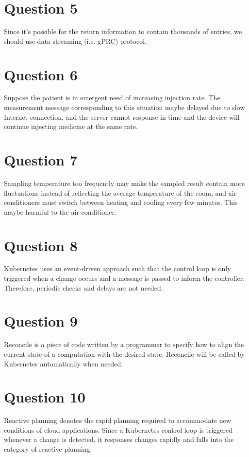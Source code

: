 \documentclass{article}
\begin{document}
\section{Question 5}
Since it's possible for the return information to contain thousands of entries, we should use data streaming (i.e. gPRC) protocol.

\section{Question 6}
Suppose the patient is in emergent need of increasing injection rate. The measurement message corresponding to this situation maybe delayed due to slow Internet connection, and the server cannot response in time and the device will continue injecting medicine at the same rate.

\section{Question 7}
Sampling temperature too frequently may make the sampled result contain more fluctuations instead of reflecting the average temperature of the room, and air conditioners must switch between heating and cooling every few minutes. This maybe harmful to the air conditioner.

\section{Question 8}
Kubernetes uses an event-driven approach such that the control loop is only triggered when a change occurs and a message is passed to inform the controller. Therefore, periodic checks and delays are not needed.

\section{Question 9}
Reconcile is a piece of code written by a programmer to specify how to align the current state of a computation with the desired state. Reconcile will be called by Kubernetes automatically when needed.

\section{Question 10}
Reactive planning denotes the rapid planning required to accommodate new conditions of cloud applications. Since a Kubernetes control loop is triggered whenever a change is detected, it responses changes rapidly and falls into the category of reactive planning.
\end{document}
